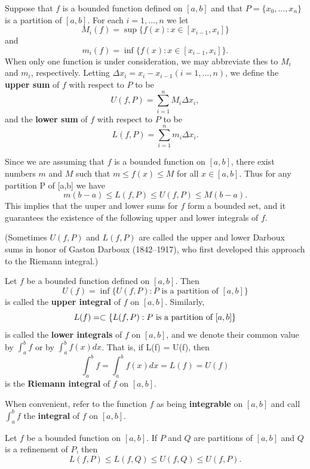 \documentclass[12pt]{article}
\begin{document}
\begin{definition}
  Suppose that $f$ is a bounded function defined on $[a,b]$ and that $P = \{
  x_0, ..., x_n \}$ is a partition of $[a,b]$. For each $i = 1, ..., n$ we
  let $$M_i(f) = \sup \{ f(x) : x \in [x_{i-1}, x_i] \}$$ and $$m_i(f) = \inf \{
  f(x) : x \in [x_{i-1}, x_i] \}.$$ When only one function is under
  consideration, we may abbreviate thes to $M_i$ and $m_i$, respectively.
  Letting $\Delta x_i = x_i - x_{i-1} (i = 1, ..., n)$, we define the
  \textbf{upper sum} of $f$ with respect to $P$ to be $$U(f,P) =
  \sum_{i=1}^{n} M_i \Delta x_i,$$ and the \textbf{lower sum} of $f$ with respect
  to $P$ to be $$L(f,P) = \sum_{i=1}^{n} m_i \Delta x_i.$$

  Since we are assuming that $f$ is a bounded function on $[a,b]$, there
  exist numbers $m$ and $M$ such that $m \le f(x) \le M$ for all $x \in [a,b]$.
  Thus for any partition P of [a,b] we have $$m(b - a) \le L(f, P) \le U(f, P) \le
  M(b - a).$$ This implies that the uuper and lower sums for $f$ form a
  bounded set, and it guarantees the existence of the following upper and
  lower integrals of $f$.

  \begin{remark}[History]
  (Sometimes $U(f,P)$ and $L(f,P)$ are called the upper and lower Darboux
  sums in honor of Gaston Darboux (1842--1917), who first developed this
  approach to the Riemann integral.)
  \end{remark}
\end{definition}

\begin{definition}
  Let $f$ be a bounded function defined on $[a,b]$. Then $$U(f) = \inf \{ U(f,
  P) : P \text{ is a partition of } [a,b] \}$$ is called the \textbf{upper integral}
  of $f$ on $[a,b]$. Similarly, $$L(f) = \subset \{ L(f, P) : P \text{ is a
  partition of } [a,b] \}$$ is called the \textbf{lower integrals} of $f$ on
  $[a,b]$, and we denote their common value by $\int_a^b f$ or by $\int_a^b f(x)
  dx$. That is, if L(f) = U(f), then $$\int_a^b f = \int_a^b f(x) dx = L(f) =
  U(f)$$ is the \textbf{Riemann integral} of $f$ on $[a,b]$.

  When convenient, refer to the function $f$ as being \textbf{integrable} on
  $[a,b]$ and call $\int_a^b f$ the \textbf{integral} of $f$ on $[a,b]$.
\end{definition}

\begin{theorem}
  Let $f$ be a bounded function on $[a,b]$. If $P$ and $Q$ are partitions of
  $[a,b]$ and $Q$ is a refinement of $P$, then $$L(f, P) \le L(f, Q) \le U(f, Q) \le
  U(f, P).$$
\end{theorem}
\end{document}
